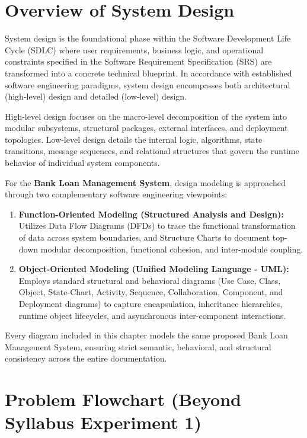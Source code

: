 \documentclass[12pt,a4paper,oneside]{report}
\begin{document}
\section{Overview of System Design}

System design is the foundational phase within the Software Development Life Cycle (SDLC) where user requirements, business logic, and operational constraints specified in the Software Requirement Specification (SRS) are transformed into a concrete technical blueprint. In accordance with established software engineering paradigms, system design encompasses both architectural (high-level) design and detailed (low-level) design.

High-level design focuses on the macro-level decomposition of the system into modular subsystems, structural packages, external interfaces, and deployment topologies. Low-level design details the internal logic, algorithms, state transitions, message sequences, and relational structures that govern the runtime behavior of individual system components.

For the \textbf{Bank Loan Management System}, design modeling is approached through two complementary software engineering viewpoints:

\begin{enumerate}
  \item \textbf{Function-Oriented Modeling (Structured Analysis and Design):} Utilizes Data Flow Diagrams (DFDs) to trace the functional transformation of data across system boundaries, and Structure Charts to document top-down modular decomposition, functional cohesion, and inter-module coupling.
  \item \textbf{Object-Oriented Modeling (Unified Modeling Language - UML):} Employs standard structural and behavioral diagrams (Use Case, Class, Object, State-Chart, Activity, Sequence, Collaboration, Component, and Deployment diagrams) to capture encapsulation, inheritance hierarchies, runtime object lifecycles, and asynchronous inter-component interactions.
\end{enumerate}

Every diagram included in this chapter models the same proposed Bank Loan Management System, ensuring strict semantic, behavioral, and structural consistency across the entire documentation.

\section{Problem Flowchart (Beyond Syllabus Experiment 1)}
\end{document}
